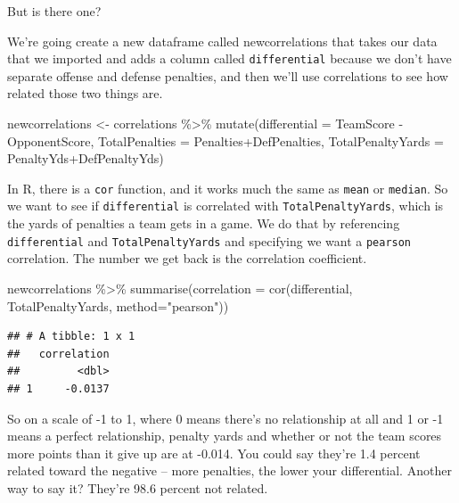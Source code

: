 \documentclass[
]{book}
\newenvironment{Shaded}{\begin{snugshade}}{\end{snugshade}}
\newcommand{\AttributeTok}[1]{\textcolor[rgb]{0.77,0.63,0.00}{#1}}
\newcommand{\FunctionTok}[1]{\textcolor[rgb]{0.00,0.00,0.00}{#1}}
\newcommand{\NormalTok}[1]{#1}
\newcommand{\OtherTok}[1]{\textcolor[rgb]{0.56,0.35,0.01}{#1}}
\newcommand{\SpecialCharTok}[1]{\textcolor[rgb]{0.00,0.00,0.00}{#1}}
\newcommand{\StringTok}[1]{\textcolor[rgb]{0.31,0.60,0.02}{#1}}
\begin{document}
But is there one?

We're going create a new dataframe called newcorrelations that takes our data that we imported and adds a column called \texttt{differential} because we don't have separate offense and defense penalties, and then we'll use correlations to see how related those two things are.

\begin{Shaded}
\begin{Highlighting}[]
\NormalTok{newcorrelations }\OtherTok{\textless{}{-}}\NormalTok{ correlations }\SpecialCharTok{\%\textgreater{}\%} 
  \FunctionTok{mutate}\NormalTok{(}\AttributeTok{differential =}\NormalTok{ TeamScore }\SpecialCharTok{{-}}\NormalTok{ OpponentScore, }\AttributeTok{TotalPenalties =}\NormalTok{ Penalties}\SpecialCharTok{+}\NormalTok{DefPenalties, }\AttributeTok{TotalPenaltyYards =}\NormalTok{ PenaltyYds}\SpecialCharTok{+}\NormalTok{DefPenaltyYds)}
\end{Highlighting}
\end{Shaded}

In R, there is a \texttt{cor} function, and it works much the same as \texttt{mean} or \texttt{median}. So we want to see if \texttt{differential} is correlated with \texttt{TotalPenaltyYards}, which is the yards of penalties a team gets in a game. We do that by referencing \texttt{differential} and \texttt{TotalPenaltyYards} and specifying we want a \texttt{pearson} correlation. The number we get back is the correlation coefficient.

\begin{Shaded}
\begin{Highlighting}[]
\NormalTok{newcorrelations }\SpecialCharTok{\%\textgreater{}\%} \FunctionTok{summarise}\NormalTok{(}\AttributeTok{correlation =} \FunctionTok{cor}\NormalTok{(differential, TotalPenaltyYards, }\AttributeTok{method=}\StringTok{"pearson"}\NormalTok{))}
\end{Highlighting}
\end{Shaded}

\begin{verbatim}
## # A tibble: 1 x 1
##   correlation
##         <dbl>
## 1     -0.0137
\end{verbatim}

So on a scale of -1 to 1, where 0 means there's no relationship at all and 1 or -1 means a perfect relationship, penalty yards and whether or not the team scores more points than it give up are at -0.014. You could say they're 1.4 percent related toward the negative -- more penalties, the lower your differential. Another way to say it? They're 98.6 percent not related.
\end{document}
